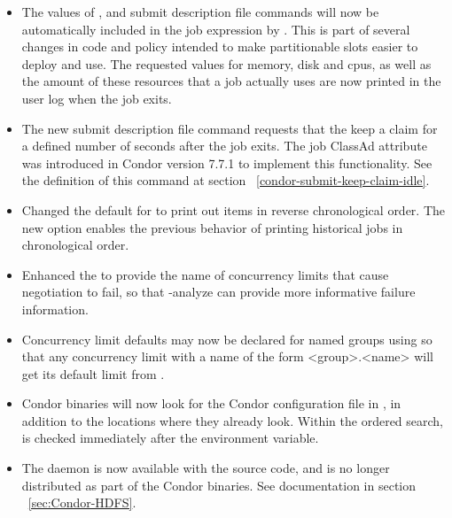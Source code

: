 \begin{itemize}

\item The values of ,  and
 submit description file commands will now be
automatically included in the job  expression by
.  This is part of several changes
in code and policy intended to make partitionable slots easier to deploy
and use.  The requested values for memory, disk and cpus, as well as the
amount of these resources that a job actually uses are now printed in the
user log when the job exits.

\item The new  submit description
file command requests that the  keep a claim for a defined
number of seconds after the job exits.
The job ClassAd attribute  was introduced in
Condor version 7.7.1 to implement this functionality.
See the definition of this command at 
section ~\ref{condor-submit-keep-claim-idle}.

\item Changed the default for  to print out
items in reverse chronological order.  
The new  option enables the previous behavior of 
printing historical jobs in chronological order.

\item Enhanced the  to provide the name of 
concurrency limits that cause negotiation to fail, so that 
 -analyze can provide more informative failure information.

\item Concurrency limit defaults may now be declared for named groups
using  so that any
concurrency limit with a name of the form <group>.<name> will get its
default limit from .

\item Condor binaries will now look for the Condor configuration file in
, in addition to the locations where
they already look.
Within the ordered search,
 is checked immediately after the 
 environment variable.

\item The  daemon is now available with the source code,
and is no longer distributed as part of the Condor binaries.
See documentation in section ~\ref{sec:Condor-HDFS}.


\end{itemize}
